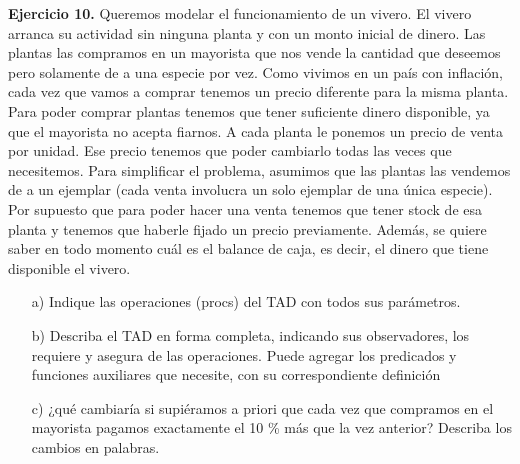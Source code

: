 \documentclass{article}
\begin{document}
\textbf{Ejercicio 10.} Queremos modelar el funcionamiento de un vivero. El vivero arranca su actividad sin ninguna planta y con
un monto inicial de dinero. Las plantas las compramos en un mayorista que nos vende la cantidad que deseemos pero solamente de a una especie por vez. Como vivimos en un pa\'is con inflaci\'on, cada vez que vamos a comprar tenemos un precio diferente para la misma planta. Para poder comprar plantas tenemos que tener suficiente dinero disponible, ya que el mayorista no acepta fiarnos. A cada planta le ponemos un precio de venta por unidad. Ese precio tenemos que poder cambiarlo todas las veces que necesitemos. Para simplificar el problema, asumimos que las plantas las vendemos de a un ejemplar (cada venta involucra un solo ejemplar de una \'unica especie). Por supuesto que para poder hacer una venta tenemos que tener stock de esa planta y tenemos que haberle fijado un precio previamente. Adem\'as, se quiere saber en todo momento cu\'al es el balance de caja, es decir, el dinero que tiene disponible el vivero.
\begin{itemize}
    \item[a)] Indique las operaciones (procs) del TAD con todos sus par\'ametros.
    \item[b)] Describa el TAD en forma completa, indicando sus observadores, los requiere y asegura de las operaciones. Puede agregar
    los predicados y funciones auxiliares que necesite, con su correspondiente definici\'on
    \item[c)] ¿qu\'e cambiar\'ia si supi\'eramos a priori que cada vez que compramos en el mayorista pagamos exactamente el 10 \% m\'as
    que la vez anterior? Describa los cambios en palabras.
\end{itemize}
\end{document}
